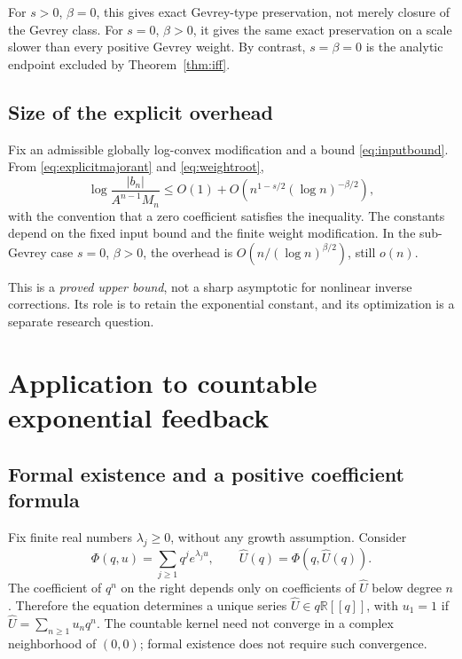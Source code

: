 \documentclass[11pt,a4paper]{article}
\numberwithin{equation}{section}
\theoremstyle{definition}
\theoremstyle{remark}
\newcommand{\R}{\mathbb R}
\newcommand{\U}{\widehat U}
\begin{document}
For $s>0$, $\beta=0$, this gives exact Gevrey-type preservation, not
merely closure of the Gevrey class. For $s=0$, $\beta>0$, it gives the
same exact preservation on a scale slower than every positive Gevrey
weight. By contrast, $s=\beta=0$ is the analytic endpoint excluded by
Theorem~\ref{thm:iff}.

\subsection{Size of the explicit overhead}

Fix an admissible globally log-convex modification and a bound
\eqref{eq:inputbound}. From \eqref{eq:explicitmajorant} and
\eqref{eq:weightroot},
\begin{equation}
 \log\frac{|b_n|}{A^{n-1}M_n}
 \le O(1)+O\left(n^{1-s/2}(\log n)^{-\beta/2}\right),
 \label{eq:overheadrefined}
\end{equation}
with the convention that a zero coefficient satisfies the inequality.
The constants depend on the fixed input bound and the finite weight
modification. In the sub-Gevrey case $s=0$, $\beta>0$, the overhead is
$O(n/(\log n)^{\beta/2})$, still $o(n)$.

This is a \emph{proved upper bound}, not a sharp asymptotic for nonlinear
inverse corrections. Its role is to retain the exponential constant, and
its optimization is a separate research question.

\section{Application to countable exponential feedback}
\label{sec:feedback}

\subsection{Formal existence and a positive coefficient formula}

Fix finite real numbers $\lambda_j\ge0$, without any growth assumption.
Consider
\begin{equation}
 \Phi(q,u)=\sum_{j\ge1}q^j e^{\lambda_j u},\qquad
 \U(q)=\Phi(q,\U(q)).
 \label{eq:feedback}
\end{equation}
The coefficient of $q^n$ on the right depends only on coefficients of
$\U$ below degree $n$. Therefore the equation determines a unique series
$\U\in q\R[[q]]$, with $u_1=1$ if
$\U=\sum_{n\ge1}u_nq^n$. The countable kernel need not converge in a
complex neighborhood of $(0,0)$; formal existence does not require such
convergence.
\end{document}
